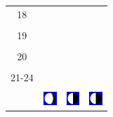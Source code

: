 \documentclass[a4paper,12pt, tikz]{scrartcl}
\begin{document}
\begin{tabularx}{\linewidth}{|c|X|X|X|}
      \hline
      18&   &       &    \\
        &   &       &    \\
      \hline
      19&   &       &    \\
        &   &       &    \\
      \hline
      20&   &       &    \\
        &   &       &    \\
      \hline
      21-24&   &       &    \\
        &   &       &    \\
      \hline  
      & \vspace{0.01cm} \centerline{\includegraphics[width=0.5cm]{moon_phases/Moon_phase_5.svg.png}} \vspace{0.1cm} & \vspace{0.01cm} \centerline{\includegraphics[width=0.5cm]{moon_phases/Moon_phase_6.svg.png}} \vspace{0.1cm} & \vspace{0.01cm} \centerline{\includegraphics[width=0.5cm]{moon_phases/Moon_phase_6.svg.png}} \vspace{0.1cm}\\
      \hline   
    \end{tabularx}




    \newpage

        \noindent
\end{document}
